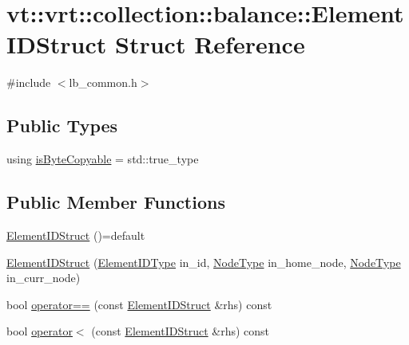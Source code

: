 \hypertarget{structvt_1_1vrt_1_1collection_1_1balance_1_1_element_i_d_struct}{}\section{vt\+:\+:vrt\+:\+:collection\+:\+:balance\+:\+:Element\+I\+D\+Struct Struct Reference}
\label{structvt_1_1vrt_1_1collection_1_1balance_1_1_element_i_d_struct}


{\ttfamily \#include $<$lb\+\_\+common.\+h$>$}

\subsection*{Public Types}
\begin{DoxyCompactItemize}
\item 
using \hyperlink{structvt_1_1vrt_1_1collection_1_1balance_1_1_element_i_d_struct_a4a5e2778f19d4b5865c45c5fa2aef344}{is\+Byte\+Copyable} = std\+::true\+\_\+type
\end{DoxyCompactItemize}
\subsection*{Public Member Functions}
\begin{DoxyCompactItemize}
\item 
\hyperlink{structvt_1_1vrt_1_1collection_1_1balance_1_1_element_i_d_struct_ada8549d8bd0ab853da3d411d21af0df9}{Element\+I\+D\+Struct} ()=default
\item 
\hyperlink{structvt_1_1vrt_1_1collection_1_1balance_1_1_element_i_d_struct_a79735785c9493564e30f03514291cee0}{Element\+I\+D\+Struct} (\hyperlink{namespacevt_1_1vrt_1_1collection_1_1balance_a14c8d2c972f2913aa3f1636e5be0a120}{Element\+I\+D\+Type} in\+\_\+id, \hyperlink{namespacevt_a866da9d0efc19c0a1ce79e9e492f47e2}{Node\+Type} in\+\_\+home\+\_\+node, \hyperlink{namespacevt_a866da9d0efc19c0a1ce79e9e492f47e2}{Node\+Type} in\+\_\+curr\+\_\+node)
\item 
bool \hyperlink{structvt_1_1vrt_1_1collection_1_1balance_1_1_element_i_d_struct_a8dc233cba462007e9a2d96b2eed4ac9b}{operator==} (const \hyperlink{structvt_1_1vrt_1_1collection_1_1balance_1_1_element_i_d_struct}{Element\+I\+D\+Struct} \&rhs) const
\item 
bool \hyperlink{structvt_1_1vrt_1_1collection_1_1balance_1_1_element_i_d_struct_a1fb50ba7df5e1786461d99208056ecde}{operator$<$} (const \hyperlink{structvt_1_1vrt_1_1collection_1_1balance_1_1_element_i_d_struct}{Element\+I\+D\+Struct} \&rhs) const
\end{DoxyCompactItemize}

